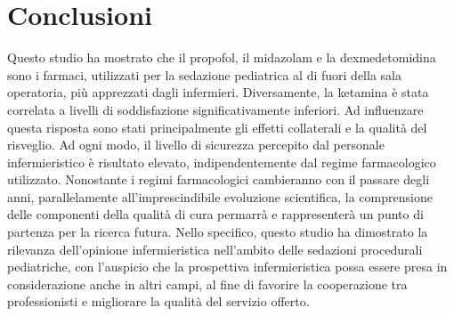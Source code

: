 \chapter{Conclusioni}

Questo studio ha mostrato che il propofol, il midazolam e la dexmedetomidina sono i farmaci, utilizzati per la sedazione pediatrica al di fuori della sala operatoria, più apprezzati dagli infermieri. Diversamente, la ketamina è stata correlata a livelli di soddisfazione significativamente inferiori. Ad influenzare questa risposta sono stati principalmente gli effetti collaterali e la qualità del risveglio. Ad ogni modo, il livello di sicurezza percepito dal personale infermieristico è risultato elevato, indipendentemente dal regime farmacologico utilizzato. Nonostante i regimi farmacologici cambieranno con il passare degli anni, parallelamente all'imprescindibile evoluzione scientifica, la comprensione delle componenti della qualità di cura permarrà e rappresenterà un punto di partenza per la ricerca futura. Nello specifico, questo studio ha dimostrato la rilevanza dell'opinione infermieristica nell'ambito delle sedazioni procedurali pediatriche, con l'auspicio che la prospettiva infermieristica possa essere presa in considerazione anche in altri campi, al fine di favorire la cooperazione tra professionisti e migliorare la qualità del servizio offerto. 